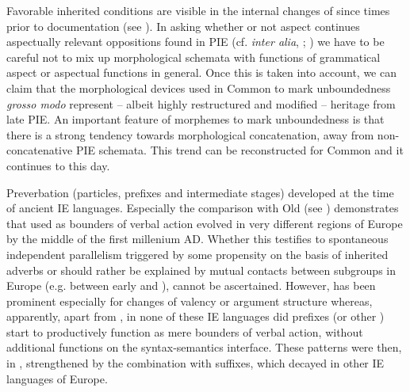 \documentclass[output=paper]{langsci/langscibook}
\begin{document}
Favorable inherited conditions are visible in the internal changes of  since times prior to documentation (see ). In asking whether or not  aspect continues aspectually relevant oppositions found in PIE (cf. \textit{inter alia}, \citealt{vanWijk1929}; \citealt{Stang1942}) we have to be careful not to mix up morphological schemata with functions of grammatical aspect or aspectual functions in general. Once this is taken into account, we can claim that the morphological devices used in Common  to mark unboundedness \textit{grosso modo} represent – albeit highly restructured and modified – heritage from late PIE. An important feature of  morphemes to mark unboundedness is that there is a strong tendency towards morphological concatenation, away from non-concatenative PIE schemata. This trend can be reconstructed for Common  and it continues to this day.

Preverbation (particles, prefixes and intermediate stages) developed at the time of ancient IE languages. Especially the comparison with Old  (see ) demonstrates that  used as bounders of verbal action evolved in very different regions of Europe by the middle of the first millenium AD. Whether this testifies to spontaneous independent parallelism triggered by some propensity on the basis of inherited adverbs or should rather be explained by mutual contacts between subgroups in Europe (e.g. between early  and ), cannot be ascertained. However,  has been prominent especially for changes of valency or argument structure whereas, apparently, apart from , in none of these IE languages did prefixes (or other ) start to productively function as mere bounders of verbal action, without additional functions on the syntax-semantics interface. These patterns were then, in , strengthened by the combination with suffixes, which decayed in other IE languages of Europe.
\end{document}
